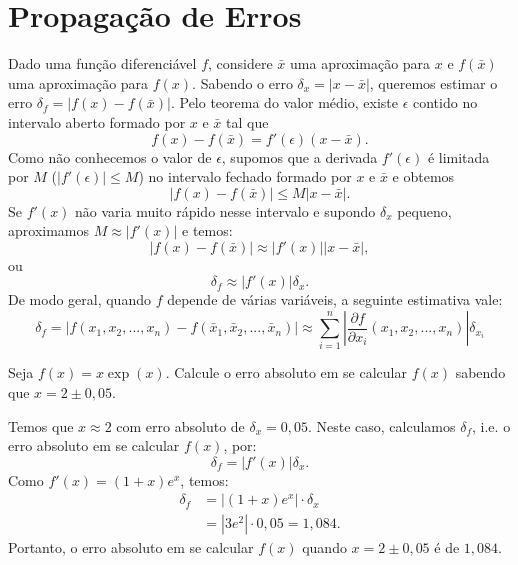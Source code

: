 \documentclass[main.tex]{subfiles}
\begin{document}
\section{Propagação de Erros}

Dado uma função diferenciável $f$, considere $\bar{x}$ uma aproximação para $x$ e $f(\bar{x})$ uma aproximação para $f(x)$. Sabendo o erro $\delta_x=|x-\bar{x}|$, queremos estimar o erro $\delta_f=|f(x)-f(\bar{x})|$. Pelo teorema do valor médio, existe $\epsilon$ contido no intervalo aberto formado por $x$ e $\bar{x}$ tal que
$$
f(x)-f(\bar{x})=f'(\epsilon)(x-\bar{x}).
$$
Como não conhecemos o valor de $\epsilon$, supomos que a derivada $f'(\epsilon)$ é limitada por $M$ ($|f'(\epsilon)|\leq M$) no intervalo fechado formado por $x$ e $\bar{x}$ e obtemos
$$
|f(x)-f(\bar{x})|\leq M|x-\bar{x}|.
$$
Se $f'(x)$ não varia muito rápido nesse intervalo e supondo $\delta_x$ pequeno, aproximamos $M\approx |f'(x)|$ e temos:
$$
|f(x)-f(\bar{x})|\approx |f'(x)||x-\bar{x}|,
$$
ou
$$
\delta_f\approx |f'(x)|\delta_x.
$$
De modo geral, quando $f$ depende de várias variáveis, a seguinte estimativa vale:
$$
\delta_f=|f(x_1,x_2,...,x_n)-f(\bar{x}_1, \bar{x}_2,...,\bar{x}_n)|\approx \sum_{i=1}^n\left|\frac{\partial f}{\partial x_i}(x_1, x_2,...,x_n)\right|\delta_{x_i}
$$

\begin{ex}
  Seja $f(x) = x\exp(x)$. Calcule o erro absoluto em se calcular $f(x)$ sabendo que $x = 2 \pm 0,05$.
\end{ex}
\begin{sol}
  Temos que $x\approx 2$ com erro absoluto de $\delta_x = 0,05$. Neste caso, calculamos $\delta_f$, i.e. o erro absoluto em se calcular $f(x)$, por:
  \begin{equation*}
    \delta_f = |f'(x)|\delta_x.
  \end{equation*}
Como $f'(x) = (1 + x)e^{x}$, temos:
\begin{align*}
  \delta_f &= |(1 + x)e^{x}|\cdot\delta_x\\
  &= |3e^2|\cdot 0,05 = 1,084.
\end{align*}
Portanto, o erro absoluto em se calcular $f(x)$ quando $x=2\pm 0,05$ é de $1,084$.
\end{sol}
\end{document}

